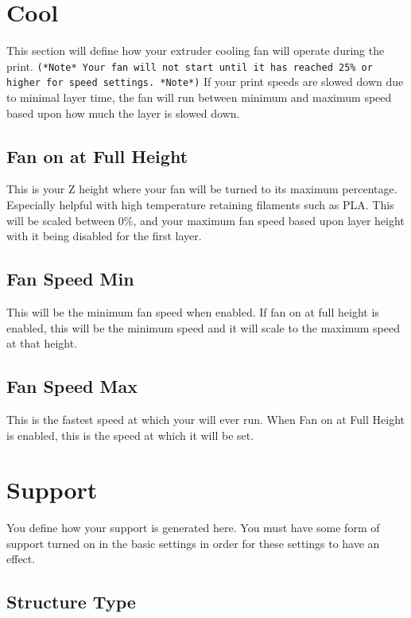\section{Cool}

This section will define how your extruder cooling fan will operate during the print. \texttt{(*Note* Your fan will not start until it has reached 25\% or higher for speed settings. *Note*)} If your print speeds are slowed down due to minimal layer time, the fan will run between minimum and maximum speed based upon how much the layer is slowed down.

\subsection{Fan on at Full Height}

This is your Z height where your fan will be turned to its maximum percentage. Especially helpful with high temperature retaining filaments such as PLA. This will be scaled between 0\%, and your maximum fan speed based upon layer height with it being disabled for the first layer.

\subsection{Fan Speed Min}

This will be the minimum fan speed when enabled. If fan on at full height is enabled, this will be the minimum speed and it will scale to the maximum speed at that height.

\subsection{Fan Speed Max}

This is the fastest speed at which your will ever run. When Fan on at Full Height is enabled, this is the speed at which it will be set.

\section{Support}

You define how your support is generated here. You must have some form of support turned on in the basic settings in order for these settings to have an effect.

\subsection{Structure Type}

